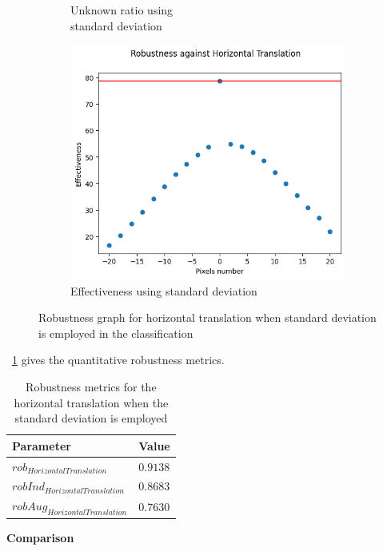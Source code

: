 \begin{figure}[h]
\begin{subfigure}{.33\textwidth}
		\caption{Unknown ratio using \\ standard deviation}
		\label{fig:ht_vu_unkn}
	\end{subfigure}%
	\begin{subfigure}{.33\textwidth}
		\centering
		\includegraphics[width=0.9\linewidth]{ImageFiles/EvalBNN/HT/VU/eff}
		\caption{Effectiveness using standard deviation}
		\label{fig:ht_vu_eff}
	\end{subfigure}
	\caption{Robustness graph for horizontal translation when standard deviation is employed in the classification}
	\label{fig:ht_vu}
\end{figure}

\Tab~\ref{table:rob_ht_vu} gives the quantitative robustness metrics.

\begin{table}[h]
	\centering
	\begin{tabular}{|| l | l ||} 
		\hline
		\textbf{Parameter} & \textbf{Value} \\
		\hline
		\hline
		$rob_{HorizontalTranslation}$ & $0.9138$ \\
		$robInd_{HorizontalTranslation}$ & $0.8683$ \\
		$robAug_{HorizontalTranslation}$ & $0.7630$ \\	
		\hline
	\end{tabular}	
	\caption{Robustness metrics for the horizontal translation when the standard deviation is employed}
	\label{table:rob_ht_vu}
\end{table}

\vspace{0.3cm}
\textbf{Comparison}
\vspace{0.1cm}

